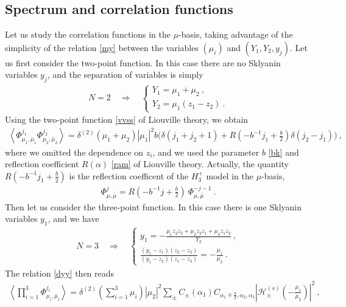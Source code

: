 \documentclass[12pt, a4paper, notitlepage, twoside]{report}
\numberwithin{equation}{section}
\theoremstyle{break}
\begin{document}
\subsection{Spectrum and correlation functions}

Let us study the correlation functions in the $\mu$-basis, taking advantage of the simplicity of the relation \eqref{my} between the variables $(\mu_i)$ and $(Y_1,Y_2,y_j)$.
Let us first consider the two-point function.
In this case there are no Sklyanin variables $y_j$, and the separation of variables is simply
\begin{align}
N=2 \quad \Rightarrow \quad \left\{\begin{array}{l} Y_1 = \mu_1+\mu_2\ , \\ Y_2 = \mu_1(z_1-z_2)\ . \end{array} \right.
\end{align}
Using the two-point function \eqref{vvss} of Liouville theory, we obtain 
\begin{align}
 \left\langle \Phi^{j_1}_{\mu_1,\bar{\mu}_1} \Phi^{j_2}_{\mu_2,\bar{\mu}_2}\right\rangle = \delta^{(2)}(\mu_1+\mu_2) |\mu_1|^2 b\Big(\delta(j_1+j_2+1)+R\left(-b^{-1}j_1+\tfrac{b}{2}\right) \delta(j_2-j_1) \Big)\ ,
\end{align}
where we omitted the dependence on $z_i$, and we used the parameter $b$ \eqref{bk} and reflection coefficient $R(\alpha)$ \eqref{ram} of Liouville theory.
Actually, the quantity $R\left(-b^{-1}j_1+\frac{b}{2}\right)$ is the reflection coefficent of the $H_3^+$ model in the $\mu$-basis, 
\begin{align}
 \Phi^j_{\mu,\bar{\mu}} = R(-b^{-1}j+\tfrac{b}{2})\ \Phi^{-j-1}_{\mu,\bar{\mu}} \ .
\end{align}
Then let us consider the three-point function.
In this case there is one Sklyanin variables $y_1$, and we have
\begin{align}
 N=3 \quad \Rightarrow \quad  \left\{\begin{array}{l} y_1 = -\frac{\mu_1z_2z_3+\mu_2z_3z_1+\mu_3z_1z_2}{Y_2}\ , \\ \frac{(y_1-z_1)(z_2-z_3)}{(y_1-z_2)(z_1-z_3)} = -\frac{\mu_1}{\mu_2}\ . \end{array}\right.
\end{align}
The relation \eqref{dyy} then reads 
\begin{align}
 \left\langle \prod_{i=1}^3\Phi^{j_i}_{\mu_i,\bar{\mu}_i} \right\rangle = \delta^{(2)}(\textstyle{\sum}_{i=1}^3\mu_i) |\mu_2|^2 \sum_\pm C_\pm(\alpha_1)C_{\alpha_1\mp\frac{b}{2},\alpha_2,\alpha_3} \left|\mathcal{H}^{(s)}_\pm(-\tfrac{\mu_1}{\mu_2})  \right|^2\ , 
\label{sfpm}
\end{align}
\end{document}
